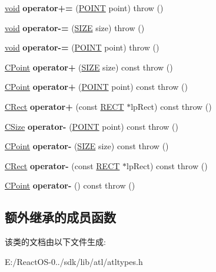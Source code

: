 \begin{DoxyCompactItemize}
\item 
\mbox{\label{class_c_point_a3afee85a576d7bfbb4832b95b735fc3f}} 
\hyperlink{interfacevoid}{void} {\bfseries operator+=} (\hyperlink{structtag_p_o_i_n_t}{P\+O\+I\+NT} point)  throw ()
\item 
\mbox{\label{class_c_point_a449e82b96314ebe3a96a0eb17abc1e21}} 
\hyperlink{interfacevoid}{void} {\bfseries operator-\/=} (\hyperlink{structtag_s_i_z_e}{S\+I\+ZE} size)  throw ()
\item 
\mbox{\label{class_c_point_a9f3a637a918b3083082b0aff38eb3d03}} 
\hyperlink{interfacevoid}{void} {\bfseries operator-\/=} (\hyperlink{structtag_p_o_i_n_t}{P\+O\+I\+NT} point)  throw ()
\item 
\mbox{\label{class_c_point_af74b4a17250ec87c552046727d7eee44}} 
\hyperlink{class_c_point}{C\+Point} {\bfseries operator+} (\hyperlink{structtag_s_i_z_e}{S\+I\+ZE} size) const  throw ()
\item 
\mbox{\label{class_c_point_a5490c167e4d50949341b2499601c6893}} 
\hyperlink{class_c_point}{C\+Point} {\bfseries operator+} (\hyperlink{structtag_p_o_i_n_t}{P\+O\+I\+NT} point) const  throw ()
\item 
\mbox{\label{class_c_point_a704ccbfd420c16d779433a653993c4f7}} 
\hyperlink{class_c_rect}{C\+Rect} {\bfseries operator+} (const \hyperlink{structtag_r_e_c_t}{R\+E\+CT} $\ast$lp\+Rect) const  throw ()
\item 
\mbox{\label{class_c_point_a686c7e7f2e057278181029514b201534}} 
\hyperlink{class_c_size}{C\+Size} {\bfseries operator-\/} (\hyperlink{structtag_p_o_i_n_t}{P\+O\+I\+NT} point) const  throw ()
\item 
\mbox{\label{class_c_point_a4ee8ea6426c1bccef54b0aae1f5cdc0e}} 
\hyperlink{class_c_point}{C\+Point} {\bfseries operator-\/} (\hyperlink{structtag_s_i_z_e}{S\+I\+ZE} size) const  throw ()
\item 
\mbox{\label{class_c_point_a06eb903afa13e678d73271154487ac60}} 
\hyperlink{class_c_rect}{C\+Rect} {\bfseries operator-\/} (const \hyperlink{structtag_r_e_c_t}{R\+E\+CT} $\ast$lp\+Rect) const  throw ()
\item 
\mbox{\label{class_c_point_a9515e3b91e6539715ef22520198a25f3}} 
\hyperlink{class_c_point}{C\+Point} {\bfseries operator-\/} () const  throw ()
\end{DoxyCompactItemize}
\subsection*{额外继承的成员函数}


该类的文档由以下文件生成\+:\begin{DoxyCompactItemize}
\item 
E\+:/\+React\+O\+S-\/0../sdk/lib/atl/atltypes.\+h\end{DoxyCompactItemize}
